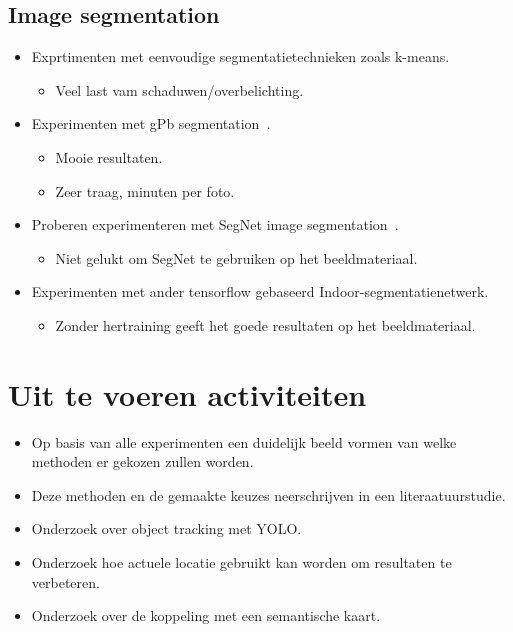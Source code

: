 \documentclass[11pt,a4paper]{article}
\begin{document}
        \subsection{Image segmentation}
            \begin{itemize}
                \item Exprtimenten met eenvoudige segmentatietechnieken zoals k-means.
                \begin{itemize}
                    \item Veel last vam schaduwen/overbelichting.
                \end{itemize}

                \item Experimenten met gPb segmentation~\cite{5557884}.
                \begin{itemize}
                    \item Mooie resultaten.
                    \item Zeer traag, minuten per foto.
                \end{itemize}

                \item Proberen experimenteren met SegNet image segmentation~\cite{Segnet}.
                \begin{itemize}
                    \item Niet gelukt om SegNet te gebruiken op het beeldmateriaal.
                \end{itemize}

                \item Experimenten met ander tensorflow gebaseerd Indoor-segmentatienetwerk.
                \begin{itemize}
                    \item Zonder hertraining geeft het goede resultaten op het beeldmateriaal.
                \end{itemize}
                
            \end{itemize}

    \section{Uit te voeren activiteiten}
        \begin{itemize}
            \item Op basis van alle experimenten een duidelijk beeld vormen van welke methoden er gekozen zullen worden.
            \item Deze methoden en de gemaakte keuzes neerschrijven in een literaatuurstudie.
            \item Onderzoek over object tracking met YOLO.
            \item Onderzoek hoe actuele locatie gebruikt kan worden om resultaten te verbeteren.
            \item Onderzoek over de koppeling met een semantische kaart.
        \end{itemize}

    
    
\end{document}
